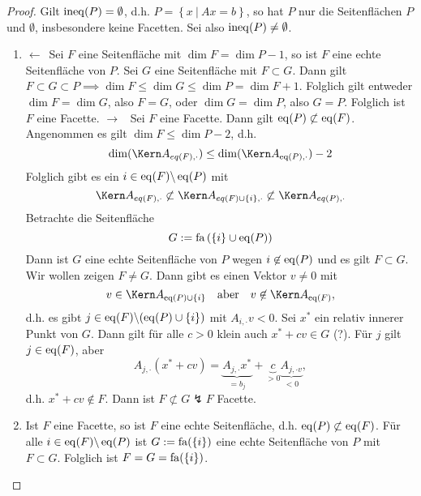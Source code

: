 \begin{proof}
	Gilt $\operatorname{ineq}(P) = \emptyset$, d.h. $P = \left\{ x\ |\ Ax=b \right\}$, so hat $P$ nur die Seitenflächen $P$ und $\emptyset$, insbesondere keine Facetten.
	Sei also $\operatorname{ineq}(P)\neq \emptyset$.
	 \begin{enumerate}[label = (\alph*)]
		\item \glqq $\leftarrow$\grqq\ Sei $F$ eine Seitenfläche mit $\dim F = \dim P -1$, so ist $F$ eine echte Seitenfläche von $P$.
			Sei $G$ eine Seitenfläche mit $F \subset G$.
			Dann gilt $F \subset  G \subset P \implies \dim F \leq \dim G \leq \dim P = \dim F+1$.
			Folglich gilt entweder $\dim F = \dim G$, also $F= G$, oder $\dim G = \dim P$, also $G=P$.
			Folglich ist $F$ eine Facette.\nl
			\glqq $\rightarrow$ \grqq\ Sei $F$ eine Facette. Dann gilt $\operatorname{eq}(P) \not \subset \operatorname{eq}(F)$. 
			Angenommen es gilt $\dim F \leq \dim P-2$, d.h. 
			\begin{equation*}
				\dim(\Kern A_{eq(F),\cdot}) \leq \dim ( \Kern A_{\eq(P),\cdot}) -2
			\end{equation*}
			Folglich gibt es ein $i \in \operatorname{eq}(F) \backslash \operatorname{eq}(P)$ mit 
			\begin{equation*}
				\Kern A_{eq(F),\cdot} \not\subset \Kern A_{eq(F)\cup \left\{i \right\},\cdot}  \not\subset	\Kern A_{eq(P),\cdot}
			\end{equation*}
			Betrachte die Seitenfläche 
			\begin{equation*}
				G:= \operatorname{fa}\left(\left\{ i \right\} \cup \operatorname{eq}(P) \right)
			\end{equation*}
			Dann ist $G$ eine echte Seitenfläche von $P$ wegen $i \not\in \operatorname{eq}(P)$ und es gilt $F \subset  G$.
			Wir wollen zeigen $F \neq G$.
			Dann gibt es einen Vektor $v \neq 0$ mit 
			\begin{equation*}
				v \in \Kern A_{\eq(P)\cup \left\{i \right\}} \quad \text{aber}\quad v \not\in \Kern A_{\eq(F)},
			\end{equation*}
			d.h. es gibt $j\in \operatorname{eq}(F)\backslash (\operatorname{eq}(P) \cup \left\{i \right\})$ mit $A_{i,\cdot}v <0$.	
			Sei $x^*$ ein relativ innerer Punkt von $G$. Dann gilt für alle $c>0$ klein auch $x^* + cv \in G$ (?).
			Für $j$ gilt $j \in \operatorname{eq}(F)$, aber
			\begin{equation*}
				 A_{j,\cdot}\left(x^* +cv \right)= \underbrace{A_{j,\cdot}x^*}_{=b_{j}} + \underbrace{c}_{>0} \underbrace{A_{j,\cdot v}}_{<0},
			\end{equation*}
			d.h. $x^* + cv \not \in F$. Dann ist $F \not\subset G \lightning F$ Facette.
		\item Ist $F$ eine Facette, so ist $F$ eine echte Seitenfläche, d.h. $\operatorname{eq}(P) \not\subset \operatorname{eq}(F)$.
			Für alle  $i \in \operatorname{eq}(F)\backslash \operatorname{eq}(P)$ ist $G:=\operatorname{fa}(\left\{i \right\})$ eine echte Seitenfläche von $P$ mit $F \subset G$. Folglich ist $F= G = \operatorname{fa}(\left\{i \right\})$.
	\end{enumerate}
\end{proof}
